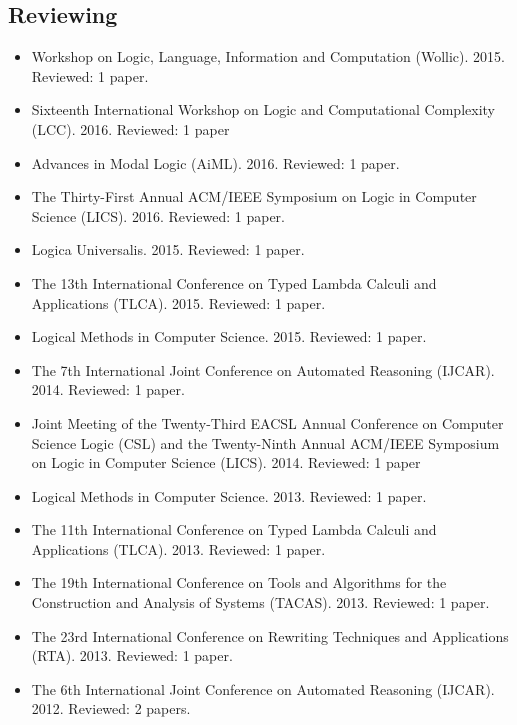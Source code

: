 \documentclass{article}
\begin{document}
  \subsection{Reviewing}
  \label{subsec:reviewing}  
  \begin{itemize}
  \item[] Workshop on Logic, Language, Information and Computation (Wollic). 2015. Reviewed: 1 paper.
  \item[] Sixteenth International Workshop on Logic and Computational Complexity (LCC). 2016. Reviewed: 1 paper
  \item[] Advances in Modal Logic (AiML). 2016. Reviewed: 1 paper.
    
  \item[] The Thirty-First Annual ACM/IEEE Symposium on Logic in Computer Science (LICS). 2016. Reviewed: 1 paper.

  \item[] Logica Universalis. 2015. Reviewed: 1 paper.
    
  \item[] The 13th International Conference on Typed Lambda Calculi and Applications (TLCA). 2015. Reviewed: 1 paper.
    
  \item[] Logical Methods in Computer Science. 2015. Reviewed: 1 paper.
    
  \item[] The 7th International Joint Conference on Automated Reasoning (IJCAR). 2014. Reviewed: 1 paper.

  \item[] Joint Meeting of the Twenty-Third EACSL Annual Conference on Computer Science Logic (CSL) and the Twenty-Ninth Annual ACM/IEEE Symposium on Logic in Computer Science (LICS). 2014. Reviewed: 1 paper

  \item[] Logical Methods in Computer Science. 2013. Reviewed: 1 paper.
    
  \item[] The 11th International Conference on Typed Lambda Calculi and Applications (TLCA). 2013. Reviewed: 1 paper.

  \item[] The 19th International Conference on Tools and Algorithms for the Construction and Analysis of Systems (TACAS).
    2013. Reviewed: 1 paper.
  
  \item[] The 23rd International Conference on Rewriting Techniques and Applications (RTA). 2013. Reviewed: 1 paper.

  \item[] The 6th International Joint Conference on Automated Reasoning (IJCAR). 2012. Reviewed: 2 papers.
  \end{itemize}
  
\end{document}
